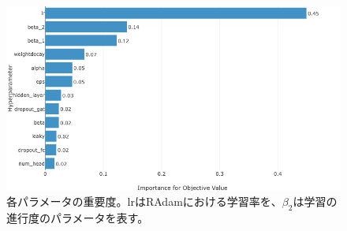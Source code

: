 \begin{figure}[H]
	\begin{center}
 \includegraphics[keepaspectratio, scale=0.3]
 	{Figure/Flavortagging/bayesian3.png}
 		\caption{各パラメータの重要度。lrはRAdamにおける学習率を、$\beta_2$は学習の進行度のパラメータを表す。}
 		\label{bayes3}
	\end{center}
\end{figure}

